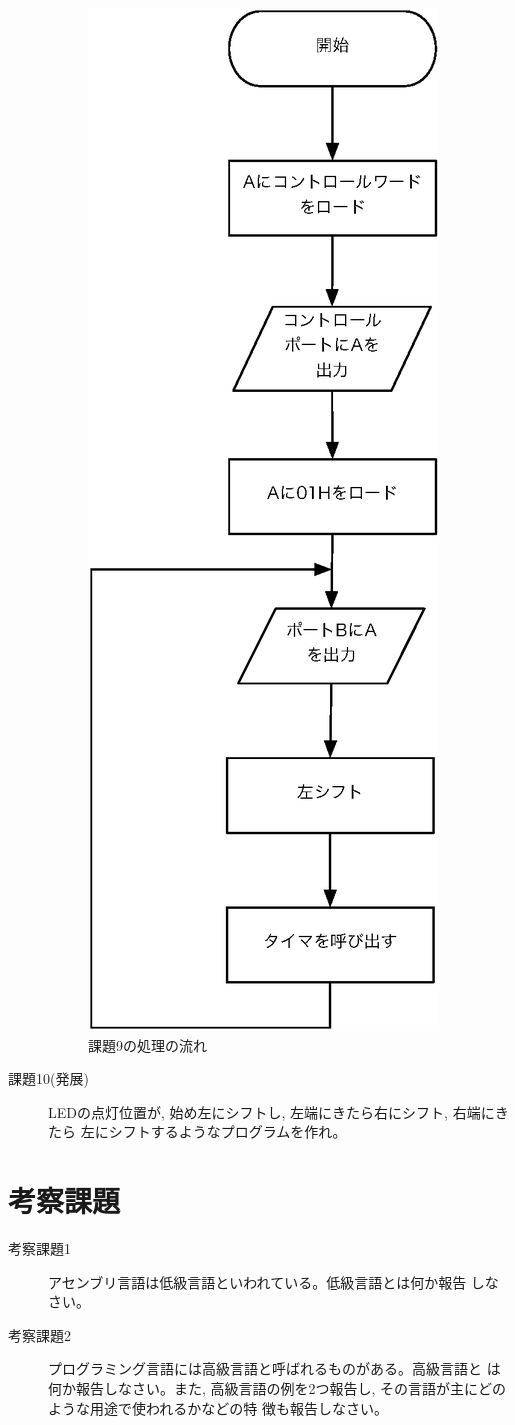 \begin{description}
\begin{figure}[htbp]
\begin{center}
\includegraphics[width=0.4\linewidth]{img/flow3.eps}
\caption{課題9の処理の流れ}
\label{fig:flow3}
\end{center}
\end{figure}

\item[課題10(発展)] LEDの点灯位置が, 始め左にシフトし, 左端にきたら右にシフト, 右端にきたら
           左にシフトするようなプログラムを作れ。

\end{description}


\newpage
\section{考察課題}

\begin{description}
\item[考察課題1] アセンブリ言語は低級言語といわれている。低級言語とは何か報告
           しなさい。
\item[考察課題2] プログラミング言語には高級言語と呼ばれるものがある。高級言語と
           は何か報告しなさい。また, 高級言語の例を2つ報告し, その言語が主にどのような用途で使われるかなどの特
      徴も報告しなさい。

\end{description}